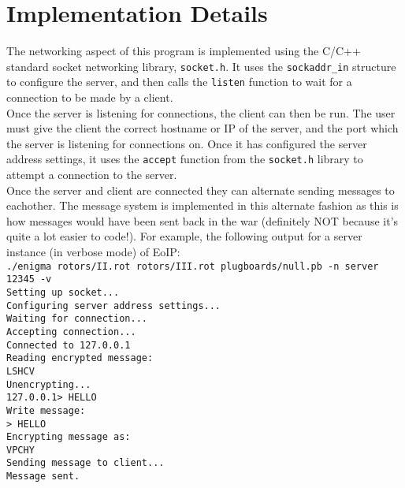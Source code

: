 \documentclass[11pt, notitlepage]{report}
\begin{document}
\section*{Implementation Details}
The networking aspect of this program is implemented using the C/C++ standard 
socket networking library, \texttt{socket.h}. It uses the \texttt{sockaddr\_in} 
structure to configure the server, and then calls the \texttt{listen} function 
to wait for a connection to be made by a client.\\

Once the server is listening for connections, the client can then be run. The 
user must give the client the correct hostname or IP of the server, and the 
port which the server is listening for connections on. Once it has configured 
the server address settings, it uses the \texttt{accept} function from the 
\texttt{socket.h} library to attempt a connection to the server.\\

Once the server and client are connected they can alternate sending messages 
to eachother. The message system is implemented in this alternate fashion 
as this is how messages would have been sent back in the war (definitely 
NOT because it's quite a lot easier to code!). For example, the following 
output for a server instance (in verbose mode) of EoIP:\\

\texttt{./enigma rotors/II.rot rotors/III.rot plugboards/null.pb -n server 12345 -v\\
        Setting up socket...\\
        Configuring server address settings...\\
        Waiting for connection...\\
        Accepting connection...\\
        Connected to 127.0.0.1\\
        Reading encrypted message:\\
        LSHCV \\
        Unencrypting...\\
        127.0.0.1> HELLO \\
        Write message:\\
        > HELLO\\
        Encrypting message as:\\
        VPCHY \\
        Sending message to client...\\
        Message sent.}\\
\end{document}
